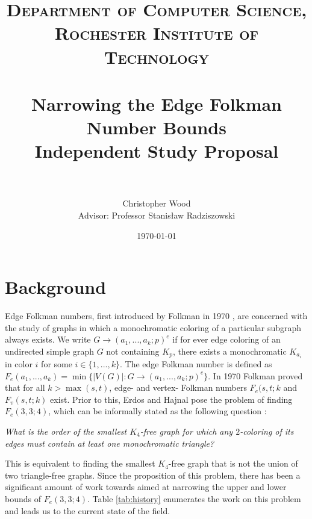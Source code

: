 \documentclass[paper=a4, fontsize=11pt]{scrartcl} %
\title{	
\normalfont \normalsize 
\textsc{Department of Computer Science, Rochester Institute of Technology} \\ [25pt] %
\horrule{2pt} \\[0.4cm] %
\huge Narrowing the Edge Folkman Number Bounds \\ 
\Large Independent Study Proposal \\
\horrule{2pt} \\[0.5cm] %
}
\author{Christopher Wood \\ Advisor: Professor Stanis{\l}aw Radziszowski} %
\date{\normalsize\today} %
\begin{document}
\maketitle %


\section{Background}
Edge Folkman numbers, first introduced by Folkman in 1970 \cite{Folkman}, are concerned
with the study of graphs in which a monochromatic coloring of a particular subgraph always exists. 
We write $G \to (a_1, ..., a_k; p)^e$ if for ever edge coloring of an undirected simple graph $G$ not 
containing $K_p$, there exists a monochromatic $K_{a_{i}}$ in color $i$ for some $i \in \{1, ..., k\}$. 
The edge Folkman number is defined as $F_e(a_1, ..., a_k) = \min\{|V(G)| : G \to (a_1, ..., a_k; p)^e\}$.
In 1970 Folkman proved that for all $k > \max(s,t)$, edge- and vertex- Folkman numbers $F_e(s,t;k$
and $F_v(s,t;k)$ exist. Prior to this, Erdos and Hajnal pose the problem of finding $F_e(3,3;4)$, which
can be informally stated as the following question \cite{Erdos01}: 

\noindent \emph{What is the order of the smallest $K_4$-free graph for which any $2$-coloring of 
its edges must contain at least one monochromatic triangle?}

This is equivalent to finding the smallest $K_4$-free graph that is not the union of two 
triangle-free graphs. Since the proposition of this problem, there has been a significant
amount of work towards aimed at narrowing the upper and lower bounds of $F_e(3,3;4)$. 
Table \ref{tab:history} enumerates the work on this problem and leads us to the 
current state of the field.
\end{document}
